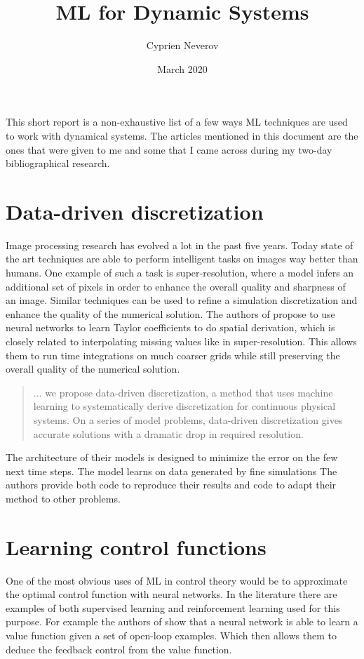 \documentclass{article}
\title{ML for Dynamic Systems}
\author{Cyprien Neverov}
\date{March 2020}
\begin{document}
This short report is a non-exhaustive list of a few ways ML techniques are used to work with dynamical systems. 
The articles mentioned in this document are the ones that were given to me and some that I came across during my two-day bibliographical research. 

\section{Data-driven discretization}

Image processing research has evolved a lot in the past five years. 
Today state of the art techniques are able to perform intelligent tasks on images way better than humans.
One example of such a task is super-resolution, where a model infers an additional set of pixels in order to enhance the overall quality and sharpness of an image.
Similar techniques can be used to refine a simulation discretization and enhance the quality of the numerical solution.
The authors of \cite{Bar-Sinai15344} propose to use neural networks to learn Taylor coefficients to do spatial derivation, which is closely related to interpolating missing values like in super-resolution. 
This allows them to run time integrations on much coarser grids while still preserving the overall quality of the numerical solution.

\begin{quote}
    ... we propose data-driven discretization, a method that uses machine learning to systematically derive discretization for continuous physical systems. On a series of model problems, data-driven discretization gives accurate solutions with a dramatic drop in required resolution.
\end{quote}

The architecture of their models is designed to minimize the error on the few next time steps. 
The model learns on data generated by fine simulations
The authors provide both code to reproduce their results and code to adapt their method to other problems. 


\section{Learning control functions}

One of the most obvious uses of ML in control theory would be to approximate the optimal control function with neural networks.
In the literature there are examples of both supervised learning and reinforcement learning used for this purpose.
For example the authors of \cite{nakamurazimmerer2019adaptive} show that a neural network is able to learn a value function given a set of open-loop examples. 
Which then allows them to deduce the feedback control from the value function.
\end{document}
